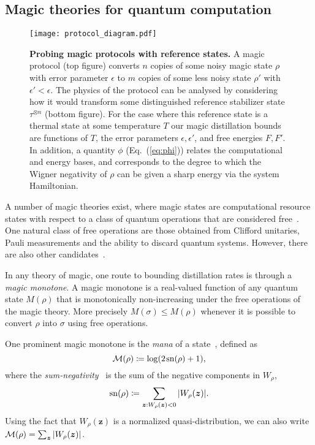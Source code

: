 \documentclass[
onecolumn,
superscriptaddress
]{revtex4-1}
\def\z{\boldsymbol{z}}
\def\M{{\cal M}}
\begin{document}
\subsection*{Magic theories for quantum computation}
\begin{figure}[t]
    \centering
        \texttt{[image: protocol\_diagram.pdf]}
    \caption{\textbf{Probing magic protocols with reference states.} 
	A magic protocol (top figure) converts $n$ copies of some noisy magic state $\rho$ with error parameter $\epsilon$ to $m$ copies of some less noisy state $\rho'$ with $\epsilon' < \epsilon$. The physics of the protocol can be analysed by considering how it would transform some distinguished reference stabilizer state $\tau^{\otimes n}$ (bottom figure). For the case where this reference state is a thermal state at some temperature $T$ our magic distillation bounds are functions of $T$, the error parameters $\epsilon, \epsilon'$, and free energies $F, F'$. In addition, a quantity $\phi$ (Eq.~(\ref{eq:phi})) relates the computational and energy bases, and corresponds to the degree to which the Wigner negativity of $\rho$ can be given a sharp energy via the system Hamiltonian.}
    \label{fig:sketch}
\end{figure}
A number of magic theories exist, where magic states are computational resource states with respect to a class of quantum operations that are considered free~\cite{Gour_2019}. One natural class of free operations are those obtained from Clifford unitaries, Pauli measurements and the ability to discard quantum systems. However, there are also other candidates~\cite{cit:ahmadi, cit:seddon, Wang_2019}.

In any theory of magic, one route to bounding distillation rates is through a \emph{magic monotone}. A magic monotone is a real-valued function of any quantum state $M(\rho)$ that is monotonically non-increasing under the free operations of the magic theory. More precisely $M(\sigma) \le M(\rho)$ whenever it is possible to convert $\rho$ into $\sigma$ using free operations.

One prominent magic monotone is the \emph{mana} of a state~\cite{cit:veitch2}, defined as
\begin{equation}
    \M(\rho) \coloneqq \log (2\hspace{1pt}{\rm sn}(\rho)+1),
\end{equation}
where the \emph{sum-negativity}~\cite{cit:veitch2} is the sum of the negative components in $W_\rho$,
\begin{equation}
    {\rm sn}(\rho) \coloneqq \sum\limits_{\z: W_\rho(\z) < 0} \abs{W_\rho(\z)}.
\end{equation}
Using the fact that $W_\rho(\z)$ is a normalized quasi-distribution, we can also write $\M(\rho) = \sum_{\z} |W_\rho(\z)|$.
\end{document}
